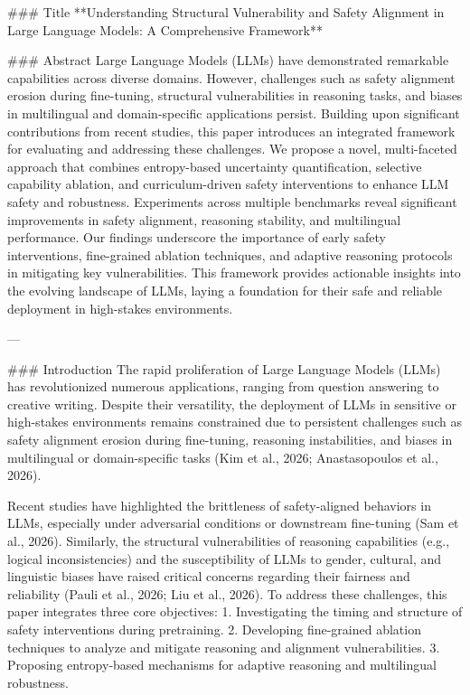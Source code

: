 ### Title  
**Understanding Structural Vulnerability and Safety Alignment in Large Language Models: A Comprehensive Framework**

### Abstract  
Large Language Models (LLMs) have demonstrated remarkable capabilities across diverse domains. However, challenges such as safety alignment erosion during fine-tuning, structural vulnerabilities in reasoning tasks, and biases in multilingual and domain-specific applications persist. Building upon significant contributions from recent studies, this paper introduces an integrated framework for evaluating and addressing these challenges. We propose a novel, multi-faceted approach that combines entropy-based uncertainty quantification, selective capability ablation, and curriculum-driven safety interventions to enhance LLM safety and robustness. Experiments across multiple benchmarks reveal significant improvements in safety alignment, reasoning stability, and multilingual performance. Our findings underscore the importance of early safety interventions, fine-grained ablation techniques, and adaptive reasoning protocols in mitigating key vulnerabilities. This framework provides actionable insights into the evolving landscape of LLMs, laying a foundation for their safe and reliable deployment in high-stakes environments.

---

### Introduction  
The rapid proliferation of Large Language Models (LLMs) has revolutionized numerous applications, ranging from question answering to creative writing. Despite their versatility, the deployment of LLMs in sensitive or high-stakes environments remains constrained due to persistent challenges such as safety alignment erosion during fine-tuning, reasoning instabilities, and biases in multilingual or domain-specific tasks (Kim et al., 2026; Anastasopoulos et al., 2026).

Recent studies have highlighted the brittleness of safety-aligned behaviors in LLMs, especially under adversarial conditions or downstream fine-tuning (Sam et al., 2026). Similarly, the structural vulnerabilities of reasoning capabilities (e.g., logical inconsistencies) and the susceptibility of LLMs to gender, cultural, and linguistic biases have raised critical concerns regarding their fairness and reliability (Pauli et al., 2026; Liu et al., 2026). To address these challenges, this paper integrates three core objectives:  
1. Investigating the timing and structure of safety interventions during pretraining.  
2. Developing fine-grained ablation techniques to analyze and mitigate reasoning and alignment vulnerabilities.  
3. Proposing entropy-based mechanisms for adaptive reasoning and multilingual robustness.  


